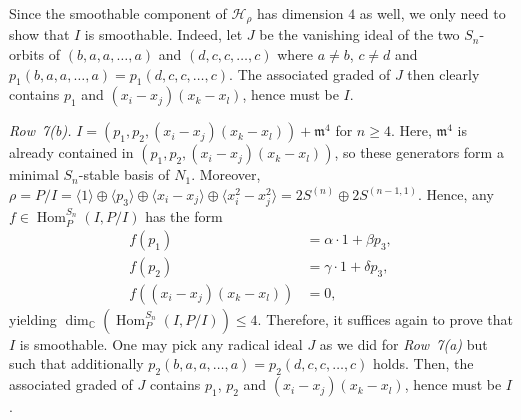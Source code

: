 \documentclass[11pt]{amsart}
\theoremstyle{definition}
\newcommand{\CC}{\mathbb{C}}
\newcommand{\mm}{\mathfrak{m}}
\newcommand{\HH}{\mathcal{H}}
\DeclareMathOperator{\Hom}{Hom}
\begin{document}
Since the smoothable component of $\HH_\rho$ has dimension $4$ as well, we only need to show that $I$ is smoothable. Indeed, let $J$ be the vanishing ideal of the two $S_n$-orbits of $(b,a,a,\ldots,a)$ and $(d,c,c,\ldots,c)$ where $a \neq b$, $c \neq d$ and $p_1(b,a,a,\ldots,a) = p_1(d,c,c,\ldots,c)$. The associated graded of $J$ then clearly contains $p_1$ and $(x_i - x_j)(x_k - x_l)$, hence must be $I$.

\medskip
\emph{Row~7(b).} $I = (p_1,p_2,(x_i-x_j)(x_k-x_l)) + \mm^4$ for $n \geq 4$. Here, $\mm^4$ is already contained in $(p_1,p_2,(x_i-x_j)(x_k-x_l))$, so these generators form a minimal $S_n$-stable basis of $N_1$. Moreover, $\rho = P/I = \langle 1 \rangle \oplus \langle p_3 \rangle \oplus \langle x_i - x_j \rangle \oplus \langle x_i^2 - x_j^2 \rangle = 2S^{(n)} \oplus 2 S^{(n-1,1)}$.
Hence, any $f \in \Hom^{S_n}_{P}(I,P/I)$ has the form
\begin{align*}
    f(p_1) &= \alpha \cdot 1 + \beta p_3, \\
    f(p_2) &= \gamma \cdot 1 + \delta p_3, \\
    f((x_i-x_j)(x_k-x_l)) &= 0,
\end{align*}
yielding $\dim_\CC(\Hom^{S_n}_P(I,P/I)) \leq 4$. Therefore, it suffices again to prove that $I$ is smoothable. One may pick any radical ideal $J$ as we did for \emph{Row~7(a)} but such that additionally $p_2(b,a,a,\ldots,a) = p_2(d,c,c,\ldots,c)$ holds. Then, the associated graded of $J$ contains $p_1$, $p_2$ and $(x_i-x_j)(x_k-x_l)$, hence must be $I$.
\end{document}

